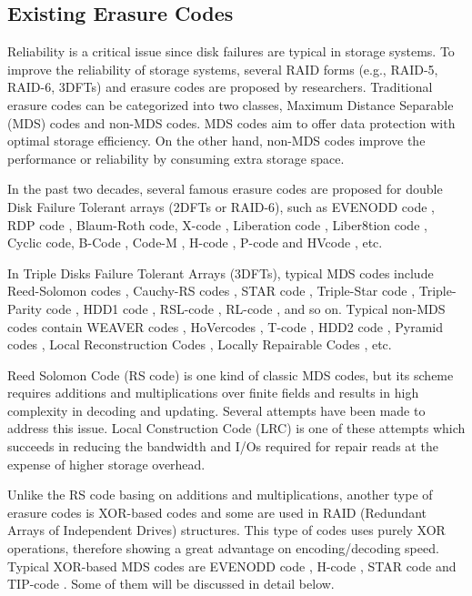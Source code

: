 \documentclass[sigconf]{acmart}
\begin{document}
\subsection{Existing Erasure Codes}\label{existEC}

Reliability is a critical issue since disk failures are typical in storage systems. To improve the reliability of storage systems, several RAID forms (e.g., RAID-5, RAID-6, 3DFTs) and erasure codes are proposed by researchers.  Traditional erasure codes can be categorized into two classes, Maximum Distance Separable (MDS) codes and non-MDS codes. MDS codes aim to offer data protection with optimal storage efficiency. On the other hand, non-MDS codes improve the performance or reliability by consuming extra storage space.

In the past two decades, several famous erasure codes are proposed for double Disk Failure Tolerant arrays (2DFTs or RAID-6), such as EVENODD code \cite{EVENODD}, RDP code \cite{RDP}, Blaum-Roth code\cite{BlaumRoth}, X-code \cite{XCode}, Liberation code \cite{Liberation}, Liber8tion code \cite{Liber8tion}, Cyclic \cite {Cyclic} code, B-Code \cite{BCode}, Code-M \cite{Code-M}, H-code \cite{hcode}, P-code \cite{PCode} and HVcode \cite{HVCode}, etc.

In Triple Disks Failure Tolerant Arrays (3DFTs), typical MDS codes include Reed-Solomon codes \cite{RS}, Cauchy-RS codes \cite{CRS}, STAR code \cite{STAR}, Triple-Star code \cite{TripleStar}, Triple-Parity code \cite{TPtech}, HDD1 code \cite{HDD}, RSL-code \cite{RSL}, RL-code \cite{RL}, and so on. Typical non-MDS codes contain WEAVER codes \cite{WEAVER}, HoVercodes \cite{HoVer}, T-code \cite{TCode}, HDD2 code \cite{HDD}, Pyramid codes \cite{Pyramid}, Local Reconstruction Codes \cite{LRC}, Locally Repairable Codes \cite{XORing}, etc.


Reed Solomon Code \cite{RS} (RS code) is one kind of classic MDS codes, but its scheme requires additions and multiplications over finite fields and results in high complexity in decoding and updating. Several attempts have been made to address this issue. Local Construction Code (LRC) \cite{LRC} is one of these attempts which succeeds in reducing the bandwidth and I/Os required for repair reads at the expense of higher storage overhead.

Unlike the RS code basing on additions and multiplications, another type of erasure codes is XOR-based codes and some are used in RAID (Redundant Arrays of Independent Drives) structures. This type of codes uses purely XOR operations, therefore showing a great advantage on encoding/decoding speed. Typical XOR-based MDS codes are EVENODD code \cite{EVENODD}, H-code \cite{hcode}, STAR code \cite{STAR} and TIP-code \cite{tip}. Some of them will be discussed in detail below.
\end{document}
